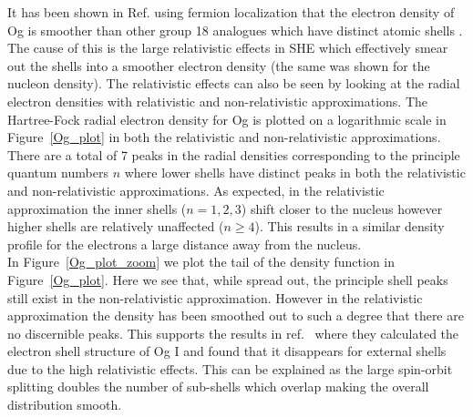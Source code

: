 \documentclass[10pt,a4paper, twoside, openright]{report}
\begin{document}
It has been shown in Ref. \cite{Jerabek2018} using fermion localization that the electron density of Og is smoother than other group 18 analogues which have distinct atomic shells . The cause of this is the large relativistic effects in SHE which effectively smear out the shells into a smoother electron density (the same was shown for the nucleon density). The relativistic effects can also be seen by looking at the radial electron densities with relativistic and non-relativistic approximations. The Hartree-Fock radial electron density for Og is plotted on a logarithmic scale in Figure~\ref{Og_plot} in both the relativistic and non-relativistic approximations. There are a total of 7 peaks in the radial densities corresponding to the principle quantum numbers $n$ where lower shells have distinct peaks in both the relativistic and non-relativistic approximations. As expected, in the relativistic approximation the inner shells ($n=1,2,3$) shift closer to the nucleus however higher shells are relatively unaffected ($n \geq 4$). This results in a similar density profile for the electrons a large distance away from the nucleus. \\
\linebreak
In Figure~\ref{Og_plot_zoom} we plot the tail of the density function in Figure~\ref{Og_plot}. Here we see that, while spread out, the principle shell peaks still exist in the non-relativistic approximation. However in the relativistic approximation the density has been smoothed out to such a degree that there are no discernible peaks. This supports the results in ref.~\cite{Jerabek2018} where they calculated the electron shell structure of Og I and found that it disappears for external shells due to the high relativistic effects. This can be explained as the large spin-orbit splitting doubles the number of sub-shells which overlap making the overall distribution smooth.\\
\end{document}
